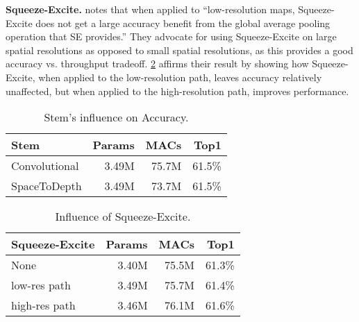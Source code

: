 \documentclass{article}
\begin{document}
\textbf{Squeeze-Excite.} \citet{ridnik2020tresnet} notes that when applied to ``low-resolution maps, Squeeze-Excite does not get a large accuracy benefit from the global average pooling operation that SE provides.''
They advocate for using Squeeze-Excite on large spatial resolutions as opposed to small spatial resolutions, as this provides a good accuracy vs. throughput tradeoff.
\cref{tab:i1kacc_squexcite} affirms their result by showing how Squeeze-Excite, when applied to the low-resolution path, leaves accuracy relatively unaffected, but when applied to the high-resolution path, improves performance.


\begin{table}
    \caption{Stem's influence on Accuracy.}
        \vskip 10pt
        \centering
        \small
        \sc
        \begin{tabular}{lrrr}
            \toprule
            Stem          & Params &  MACs & Top1   \\ \midrule
            Convolutional & 3.49M  & 75.7M & 61.5\% \\ 
            SpaceToDepth  & 3.49M  & 73.7M & 61.5\% \\ 
            \bottomrule
        \end{tabular}
        \vskip -5pt
        \label{tab:i1kacc_stem}
\end{table}

\begin{table}
    \caption{Influence of Squeeze-Excite.}
        \vskip 10pt
        \centering
        \small
        \sc
        \begin{tabular}{lrrr}
            \toprule
            Squeeze-Excite & Params &  MACs & Top1   \\ \midrule
            None           & 3.40M  & 75.5M & 61.3\% \\
            low-res path   & 3.49M  & 75.7M & 61.4\% \\
            high-res path  & 3.46M  & 76.1M & 61.6\% \\
            \bottomrule
        \end{tabular}
        \vskip -5pt
        \label{tab:i1kacc_squexcite}
\end{table}
\end{document}
